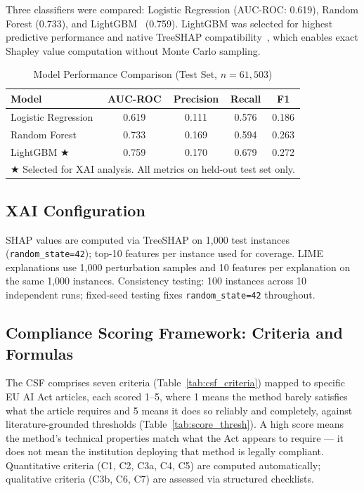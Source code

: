 \documentclass[conference]{IEEEtran}
\begin{document}
Three classifiers were compared: Logistic Regression (AUC-ROC: 0.619),
Random Forest (0.733), and LightGBM~\cite{b1} (0.759). LightGBM was
selected for highest predictive performance and native TreeSHAP
compatibility~\cite{b11}, which enables exact Shapley value computation
without Monte Carlo sampling.

\begin{table}[h]
\caption{Model Performance Comparison (Test Set, $n = 61{,}503$)}
\label{tab:model_perf}
\centering
\begin{tabular}{lcccc}
\toprule
\textbf{Model} & \textbf{AUC-ROC} & \textbf{Precision} & \textbf{Recall} & \textbf{F1} \\
\midrule
Logistic Regression & 0.619 & 0.111 & 0.576 & 0.186 \\
Random Forest       & 0.733 & 0.169 & 0.594 & 0.263 \\
LightGBM $\bigstar$ & 0.759 & 0.170 & 0.679 & 0.272 \\
\bottomrule
\multicolumn{5}{l}{\footnotesize $\bigstar$ Selected for XAI analysis. All metrics on held-out test set only.}
\end{tabular}
\end{table}

\subsection{XAI Configuration}

SHAP values are computed via TreeSHAP \cite{b11} on 1,000 test instances (\texttt{random\_state=42}); top-10 features per instance used for coverage. LIME explanations use 1,000 perturbation samples and 10 features per explanation on the same 1,000 instances. Consistency testing: 100 instances across 10 independent runs; fixed-seed testing fixes \texttt{random\_state=42} throughout.

\subsection{Compliance Scoring Framework: Criteria and Formulas}

The CSF comprises seven criteria (Table~\ref{tab:csf_criteria}) mapped to specific EU AI Act articles, each scored 1--5, where 1 means the method barely satisfies what the article requires and 5 means it does so reliably and completely, against literature-grounded thresholds (Table~\ref{tab:score_thresh}). A high score means the method's technical properties match what the Act appears to require --- it does not mean the institution deploying that method is legally compliant. Quantitative criteria (C1, C2, C3a, C4, C5) are computed automatically; qualitative criteria (C3b, C6, C7) are assessed via structured checklists.
\end{document}
